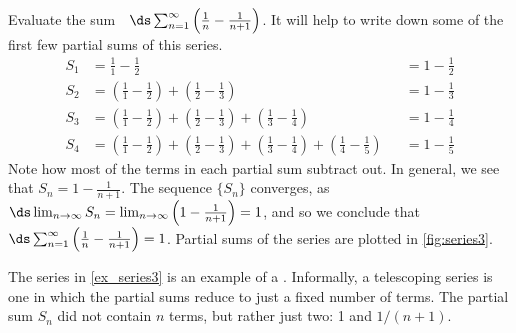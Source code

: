 \begin{example}\label{ex_series3}
Evaluate the sum~~$\ds \sum_{n=1}^\infty \left(\frac1n-\frac1{n+1}\right)$.
\solution
It will help to write down some of the first few partial sums of this series.
\begin{align*}
S_1 &=	\frac11-\frac12 & & = 1-\frac12\\
S_2 &=	\left(\frac11-\frac12\right) + \left(\frac12-\frac13\right) & & = 1-\frac13\\
S_3 &=	\left(\frac11-\frac12\right) + \left(\frac12-\frac13\right)+\left(\frac13-\frac14\right) & &= 1-\frac14\\
S_4 &=	\left(\frac11-\frac12\right) + \left(\frac12-\frac13\right)+\left(\frac13-\frac14\right) +\left(\frac14-\frac15\right)& &= 1-\frac15
\end{align*}
%
%
%
Note how most of the terms in each partial sum subtract out. In general, we see that $S_n = 1-\frac{1}{n+1}$. The sequence $\{S_n\}$ converges,  as $\ds \lim_{n\to\infty}S_n=\smallskip\lim_{n\to\infty}\left(1-\tfrac1{n+1}\right)=1$, and so we conclude that $\ds\sum_{n=1}^\infty \left(\tfrac1n-\tfrac1{n+1}\right) = 1$. Partial sums of the series are plotted in \autoref{fig:series3}.
\end{example}

The series in \autoref{ex_series3} is an example of a . Informally, a telescoping series is one in which the partial sums reduce to just a fixed number of terms. The partial sum $S_n$ did not contain $n$ terms, but rather just two: 1 and $1/(n+1)$.

